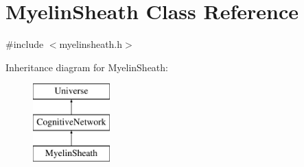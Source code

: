 \hypertarget{classMyelinSheath}{}\section{Myelin\+Sheath Class Reference}
\label{classMyelinSheath}


{\ttfamily \#include $<$myelinsheath.\+h$>$}

Inheritance diagram for Myelin\+Sheath\+:\begin{figure}[H]
\begin{center}
\leavevmode
\includegraphics[height=3.000000cm]{classMyelinSheath}
\end{center}
\end{figure}
